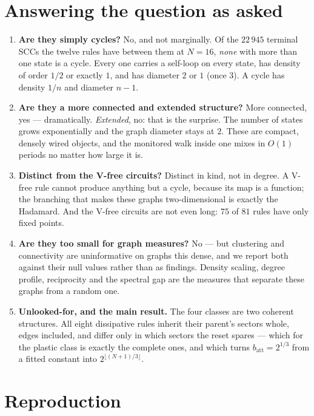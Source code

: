 \documentclass[11pt]{article}
\newcommand{\att}{\mathrm{att}}
\theoremstyle{plain}
\begin{document}
\section{Answering the question as asked}

\begin{enumerate}
\item \textbf{Are they simply cycles?} No, and not marginally. Of the $22\,945$
terminal SCCs the twelve rules have between them at $N=16$, \emph{none} with more
than one state is a cycle. Every one carries a self-loop on every state, has
density of order $1/2$ or exactly $1$, and has diameter $2$ or $1$ (once $3$). A
cycle has density $1/n$ and diameter $n-1$.

\item \textbf{Are they a more connected and extended structure?} More connected,
yes --- dramatically. \emph{Extended}, no: that is the surprise. The number of
states grows exponentially and the graph diameter stays at $2$. These are
compact, densely wired objects, and the monitored walk inside one mixes in $O(1)$
periods no matter how large it is.

\item \textbf{Distinct from the V-free circuits?} Distinct in kind, not in
degree. A V-free rule cannot produce anything but a cycle, because its map is a
function; the branching that makes these graphs two-dimensional is exactly the
Hadamard. And the V-free circuits are not even long: $75$ of $81$ rules have only
fixed points.

\item \textbf{Are they too small for graph measures?} No --- but clustering and
connectivity are uninformative on graphs this dense, and we report both against
their null values rather than as findings. Density scaling, degree profile,
reciprocity and the spectral gap are the measures that separate these graphs
from a random one.

\item \textbf{Unlooked-for, and the main result.} The four classes are two
coherent structures. All eight dissipative rules inherit their parent's sectors
whole, edges included, and differ only in which sectors the reset spares ---
which for the plastic class is exactly the complete ones, and which turns
$b_\att=2^{1/3}$ from a fitted constant into $2^{\lfloor(N+1)/3\rfloor}$.
\end{enumerate}

\section{Reproduction}
\end{document}
